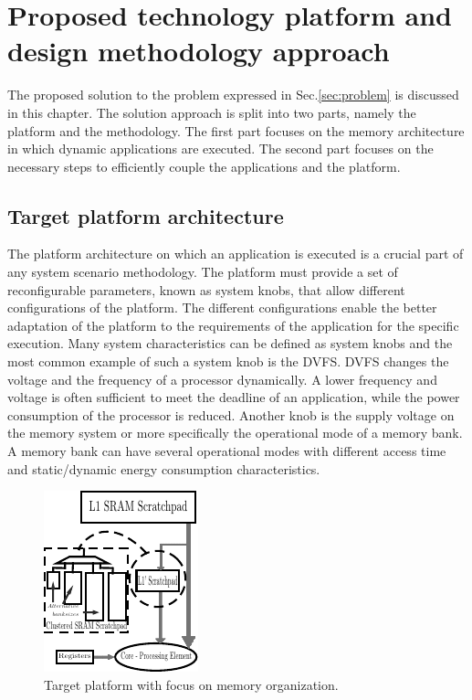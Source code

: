 \chapter{Proposed technology platform and design methodology approach}
\label{method}
The proposed solution to the problem expressed in Sec.\ref{sec:problem} is discussed in this chapter.
The solution approach is split into two parts, namely the platform and the methodology.
The first part focuses on the memory architecture in which dynamic applications are executed.
The second part focuses on the necessary steps to efficiently couple the applications and the platform.

\section{Target platform architecture}

The platform architecture on which an application is executed is a crucial part of any system scenario methodology.
The platform must provide a set of reconfigurable parameters, known as system knobs, that allow different configurations of the platform.
The different configurations enable the better adaptation of the platform to the requirements of the application for the specific execution.
Many system characteristics can be defined as system knobs and the most common example of such a system knob is the DVFS.
DVFS changes the voltage and the frequency of a processor dynamically.
A lower frequency and voltage is often sufficient to meet the deadline of an application, while the power consumption of the processor is reduced.
Another knob is the supply voltage on the memory system or more specifically the operational mode of a memory bank.
A memory bank can have several operational modes with different access time and static/dynamic energy consumption characteristics.

\begin{figure}
	\centering
	\includegraphics[scale=0.7]{Images/platform.pdf}
	\caption{Target platform with focus on memory organization. }
	\label{fig:pltfrm}
\end{figure}

